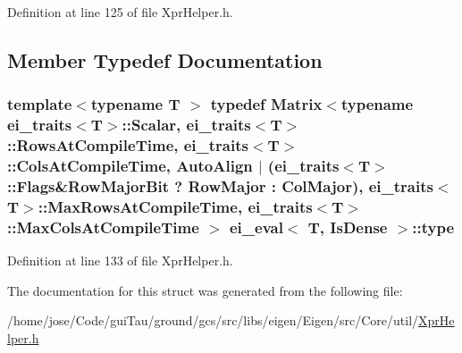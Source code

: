 Definition at line 125 of file Xpr\-Helper.\-h.



\subsection{Member Typedef Documentation}
\hypertarget{structei__eval_3_01_t_00_01_is_dense_01_4_a04068022a5b85bac5b04070a64260a47}{
\subsubsection[{type}]{\setlength{\rightskip}{0pt plus 5cm}template$<$typename T $>$ typedef {\bf Matrix}$<$typename {\bf ei\-\_\-traits}$<$T$>$\-::Scalar, {\bf ei\-\_\-traits}$<$T$>$\-::Rows\-At\-Compile\-Time, {\bf ei\-\_\-traits}$<$T$>$\-::Cols\-At\-Compile\-Time, {\bf Auto\-Align} $|$ ({\bf ei\-\_\-traits}$<$T$>$\-::Flags\&{\bf Row\-Major\-Bit} ? {\bf Row\-Major} \-: {\bf Col\-Major}), {\bf ei\-\_\-traits}$<$T$>$\-::Max\-Rows\-At\-Compile\-Time, {\bf ei\-\_\-traits}$<$T$>$\-::Max\-Cols\-At\-Compile\-Time $>$ {\bf ei\-\_\-eval}$<$ T, {\bf Is\-Dense} $>$\-::{\bf type}}}\label{structei__eval_3_01_t_00_01_is_dense_01_4_a04068022a5b85bac5b04070a64260a47}


Definition at line 133 of file Xpr\-Helper.\-h.



The documentation for this struct was generated from the following file\-:\begin{DoxyCompactItemize}
\item 
/home/jose/\-Code/gui\-Tau/ground/gcs/src/libs/eigen/\-Eigen/src/\-Core/util/\hyperlink{_xpr_helper_8h}{Xpr\-Helper.\-h}\end{DoxyCompactItemize}
